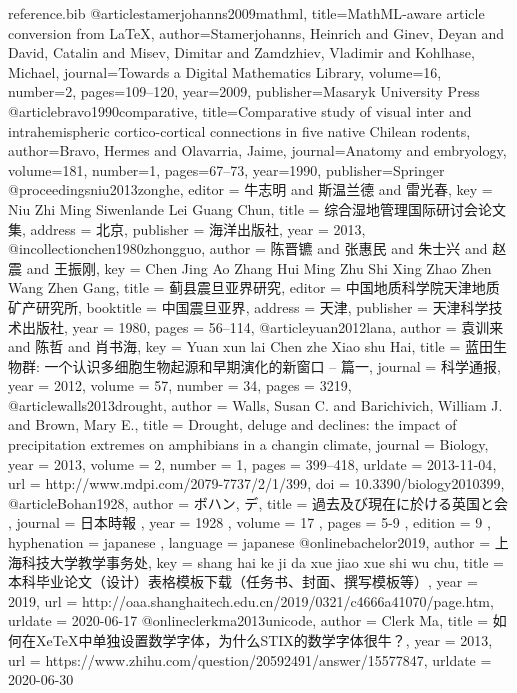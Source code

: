 \documentclass{shtthesis}
\begin{document}
\begin{filecontents}{reference.bib}
@article{stamerjohanns2009mathml,
    title={{MathML}-aware article conversion from {LaTeX}},
    author={Stamerjohanns, Heinrich and Ginev, Deyan and David, Catalin and Misev, Dimitar and Zamdzhiev, Vladimir and Kohlhase, Michael},
    journal={Towards a Digital Mathematics Library},
    volume={16},
    number={2},
    pages={109--120},
    year={2009},
    publisher={Masaryk University Press}
}
@article{bravo1990comparative,
    title={Comparative study of visual inter and intrahemispheric cortico-cortical connections in five native Chilean rodents},
    author={Bravo, Hermes and Olavarria, Jaime},
    journal={Anatomy and embryology},
    volume={181},
    number={1},
    pages={67--73},
    year={1990},
    publisher={Springer}
}
@proceedings{niu2013zonghe,
    editor       = {牛志明 and 斯温兰德 and 雷光春},
    key          = {Niu Zhi Ming Siwenlande Lei Guang Chun},
    title        = {综合湿地管理国际研讨会论文集},
    address      = {北京},
    publisher    = {海洋出版社},
    year         = {2013},
}
@incollection{chen1980zhongguo,
    author       = {陈晋镳 and 张惠民 and 朱士兴 and 赵震 and 王振刚},
    key          = {Chen Jing Ao Zhang Hui Ming Zhu Shi Xing Zhao Zhen Wang Zhen Gang},
    title        = {蓟县震旦亚界研究},
    editor       = {中国地质科学院天津地质矿产研究所},
    booktitle    = {中国震旦亚界},
    address      = {天津},
    publisher    = {天津科学技术出版社},
    year         = {1980},
    pages        = {56--114},
}
@article{yuan2012lana,
    author       = {袁训来 and 陈哲 and 肖书海},
    key          = {Yuan xun lai Chen zhe Xiao shu Hai},
    title        = {蓝田生物群: 一个认识多细胞生物起源和早期演化的新窗口 -- 篇一},
    journal      = {科学通报},
    year         = {2012},
    volume       = {57},
    number       = {34},
    pages        = {3219},
}
@article{walls2013drought,
    author       = {Walls, Susan C. and Barichivich, William J. and Brown, Mary E.},
    title        = {Drought, deluge and declines: the impact of precipitation extremes on amphibians in a changin climate},
    journal      = {Biology},
    year         = {2013},
    volume       = {2},
    number       = {1},
    pages        = {399--418},
    urldate      = {2013-11-04},
    url          = {http://www.mdpi.com/2079-7737/2/1/399},
    doi          = {10.3390/biology2010399},
}
@article{Bohan1928,
    author = { ボハン, デ},
    title = { 過去及び現在に於ける英国と会 },
    journal = { 日本時報 },
    year = { 1928 },
    volume = { 17 },
    pages = { 5-9 },
    edition = { 9 },
    hyphenation = { japanese },
    language = { japanese }
}
@online{bachelor2019,
  author = {上海科技大学教学事务处},
  key = {shang hai ke ji da xue jiao xue shi wu chu},
  title = {本科毕业论文（设计）表格模板下载（任务书、封面、撰写模板等）},
  year = 2019,
  url = {http://oaa.shanghaitech.edu.cn/2019/0321/c4666a41070/page.htm},
  urldate = {2020-06-17}
}
@online{clerkma2013unicode,
  author = {Clerk Ma},
  title = {如何在{XeTeX}中单独设置数学字体，为什么{STIX}的数学字体很牛？},
  year = 2013,
  url = {https://www.zhihu.com/question/20592491/answer/15577847},
  urldate = {2020-06-30}
}
\end{filecontents}
\end{document}
